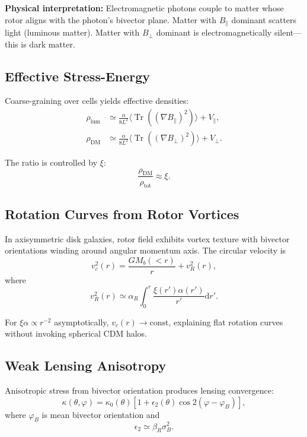 \documentclass[11pt,a4paper]{article}
\numberwithin{equation}{section}
\theoremstyle{plain}
\theoremstyle{definition}
\theoremstyle{remark}
\DeclareMathOperator{\Tr}{Tr}
\newcommand{\dd}{\mathrm{d}}
\begin{document}
\textbf{Physical interpretation:} Electromagnetic photons couple to matter whose rotor aligns with the photon's bivector plane. Matter with $B_\parallel$ dominant scatters light (luminous matter). Matter with $B_\perp$ dominant is electromagnetically silent—this is dark matter.

\subsection{Effective Stress-Energy}

Coarse-graining over cells yields effective densities:
\begin{align}
\rho_{\mathrm{lum}} &\simeq \frac{\alpha}{8L^2}\langle\Tr((\nabla B_\parallel)^2)\rangle + V_\parallel,\\
\rho_{\mathrm{DM}} &\simeq \frac{\alpha}{8L^2}\langle\Tr((\nabla B_\perp)^2)\rangle + V_\perp.
\end{align}

The ratio is controlled by $\xi$:
\begin{equation}
\frac{\rho_{\mathrm{DM}}}{\rho_{\mathrm{tot}}} \approx \xi.
\end{equation}

\subsection{Rotation Curves from Rotor Vortices}

In axisymmetric disk galaxies, rotor field exhibits vortex texture with bivector orientations winding around angular momentum axis. The circular velocity is
\begin{equation}
v_c^2(r) = \frac{GM_b(<r)}{r} + v_R^2(r),
\label{eq:rotation-curve}
\end{equation}
where
\begin{equation}
v_R^2(r) \simeq \alpha_R \int_0^r \frac{\xi(r')\alpha(r')}{r'}\dd r'.
\end{equation}

For $\xi\alpha \propto r^{-2}$ asymptotically, $v_c(r) \to \mathrm{const}$, explaining flat rotation curves without invoking spherical CDM halos.

\subsection{Weak Lensing Anisotropy}

Anisotropic stress from bivector orientation produces lensing convergence:
\begin{equation}
\kappa(\theta,\varphi) = \kappa_0(\theta)\left[1 + \epsilon_2(\theta)\cos 2(\varphi - \varphi_B)\right],
\label{eq:lensing-quadrupole}
\end{equation}
where $\varphi_B$ is mean bivector orientation and
\begin{equation}
\epsilon_2 \simeq \beta_R\sigma_B^2.
\end{equation}
\end{document}
